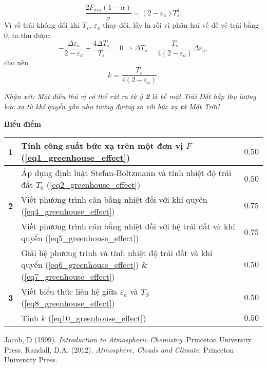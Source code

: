 \begin{enumerate}[label = \textbf{\arabic*.}]
        \begin{equation} \label{eq8_greenhouse_effect}
            \frac{2 F_{avg}(1-\alpha)}{\sigma} = (2 - \varepsilon_a) T_s^4.
        \end{equation}
        Vì vế trái không đổi khi \(T_s ,\ \varepsilon_a\) thay đổi, lấy ln rồi vi phân hai vế để vế trái bằng $0$, ta thu được:
        \begin{equation} \label{eq9_greenhouse_effect}
            -\frac{\Delta \varepsilon_a}{2-\varepsilon_a} + \frac{4 \Delta T_s}{T_s} = 0 \Rightarrow \Delta T_s = \frac{T_s}{4(2-\varepsilon_a)} \Delta \varepsilon_a,
        \end{equation}
        cho nên
        \begin{equation} \label{eq10_greenhouse_effect}
        k = \frac{T_s}{4(2-\varepsilon_a)}. %
        \end{equation}
    \end{enumerate}
\textit{Nhận xét: Một điều thú vị có thể rút ra từ ý \textbf{2} là bề mặt Trái Đất hấp thụ lượng bức xạ từ khí quyển gần như tương đương so với bức xạ từ Mặt Trời!}
\vspace{5mm}

\textbf{Biểu điểm}
\begin{center}
\begin{tabular}{|>{\centering\arraybackslash}m{1cm}|>{\raggedright\arraybackslash}m{14cm}| >{\centering\arraybackslash}m{1cm}|}
    \hline
    \textbf{1} & Tính công suất bức xạ trên một đơn vị $F$ (\ref{eq1_greenhouse_effect}) & $0.50$ \\
    \cline{2-3}
    & Áp dụng định luật Stefan-Boltzmann và tính nhiệt độ trái đất $T_0$ (\ref{eq2_greenhouse_effect}) & $0.50$ \\
    \hline
    \textbf{2} & Viết phương trình cân bằng nhiệt đối với khí quyển (\ref{eq4_greenhouse_effect}) & $0.75$ \\
    \cline{2-3}
    & Viết phương trình cân bằng nhiệt đối với hệ trái đất và khí quyển (\ref{eq5_greenhouse_effect}) & $0.75$ \\
    \cline{2-3}
    & Giải hệ phương trình và tính nhiệt độ trái đất và khí quyển (\ref{eq6_greenhouse_effect}) \& (\ref{eq7_greenhouse_effect}) & $0.50$ \\
    \hline
    \textbf{3} & Viết biểu thức liên hệ giữa $\varepsilon_a$ và $T_S$ (\ref{eq8_greenhouse_effect}) & $0.50$ \\
    \cline{2-3}
    & Tính $k$ (\ref{eq10_greenhouse_effect}) & $0.50$ \\
    \hline
\end{tabular}
\end{center}


\begin{thebibliography}{}
 Jacob, D (1999). \textit{Introduction to Atmospheric Chemistry}. Princeton University Press.
 Randall, D.A. (2012). \textit{Atmosphere, Clouds and Climate}. Princeton University Press.
\end{thebibliography}